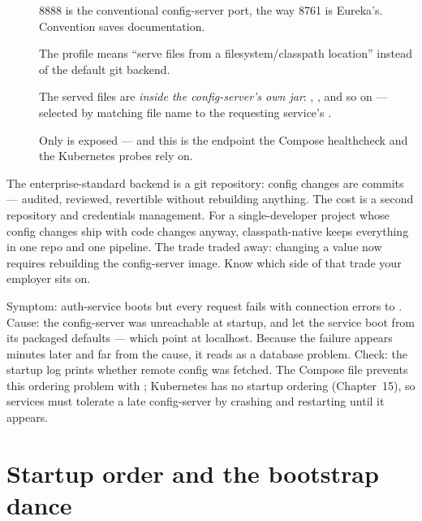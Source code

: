 \begin{description}
  \item[] 8888 is the conventional config-server port, the way 8761
  is Eureka's. Convention saves documentation.
  \item[] The  profile means ``serve files from a
  filesystem/classpath location'' instead of the default git backend.
  \item[] The served files are \emph{inside the config-server's own
  jar}: ,
  , and so on --- selected by matching file name to
  the requesting service's .
  \item[] Only  is exposed --- and this is the endpoint
  the Compose healthcheck and the Kubernetes probes rely on.
\end{description}

\begin{decision}
The enterprise-standard backend is a git repository: config changes are
commits --- audited, reviewed, revertible without rebuilding anything.
The cost is a second repository and credentials management. For a
single-developer project whose config changes ship with code changes
anyway, classpath-native keeps everything in one repo and one pipeline.
The trade traded away: changing a value now requires rebuilding the
config-server image. Know which side of that trade your employer sits on.
\end{decision}

\begin{pitfall}
Symptom: auth-service boots but every request fails with connection
errors to . Cause: the config-server was unreachable
at startup, and  let the service boot from
its packaged defaults --- which point at localhost. Because the failure
appears minutes later and far from the cause, it reads as a database
problem. Check: the startup log prints whether remote config was fetched.
The Compose file prevents this ordering problem with
; Kubernetes has no
startup ordering (Chapter~15), so services must tolerate a late
config-server by crashing and restarting until it appears.
\end{pitfall}

\section{Startup order and the bootstrap dance}

